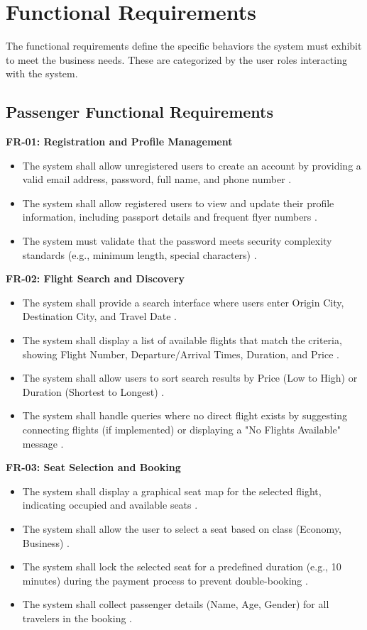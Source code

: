 \documentclass[12pt, a4paper]{article}
\begin{document}
	\newpage
	\section{Functional Requirements}
	
	The functional requirements define the specific behaviors the system must exhibit to meet the business needs. These are categorized by the user roles interacting with the system.
	
	\subsection{Passenger Functional Requirements}
	
	\textbf{FR-01: Registration and Profile Management}
	\begin{itemize}
		\item The system shall allow unregistered users to create an account by providing a valid email address, password, full name, and phone number \cite{ref26}.
		\item The system shall allow registered users to view and update their profile information, including passport details and frequent flyer numbers \cite{ref32}.
		\item The system must validate that the password meets security complexity standards (e.g., minimum length, special characters) \cite{ref2}.
	\end{itemize}
	
	\textbf{FR-02: Flight Search and Discovery}
	\begin{itemize}
		\item The system shall provide a search interface where users enter Origin City, Destination City, and Travel Date \cite{ref9, ref32}.
		\item The system shall display a list of available flights that match the criteria, showing Flight Number, Departure/Arrival Times, Duration, and Price \cite{ref33}.
		\item The system shall allow users to sort search results by Price (Low to High) or Duration (Shortest to Longest) \cite{ref26}.
		\item The system shall handle queries where no direct flight exists by suggesting connecting flights (if implemented) or displaying a "No Flights Available" message \cite{ref9}.
	\end{itemize}
	
	\textbf{FR-03: Seat Selection and Booking}
	\begin{itemize}
		\item The system shall display a graphical seat map for the selected flight, indicating occupied and available seats \cite{ref32}.
		\item The system shall allow the user to select a seat based on class (Economy, Business) \cite{ref10}.
		\item The system shall lock the selected seat for a predefined duration (e.g., 10 minutes) during the payment process to prevent double-booking \cite{ref29}.
		\item The system shall collect passenger details (Name, Age, Gender) for all travelers in the booking \cite{ref9}.
	\end{itemize}
	
\end{document}
